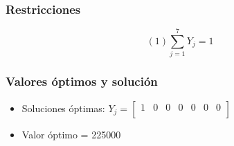 \documentclass[a4paper,12pt]{article}
\begin{document}
\subsubsection{Restricciones}
\begin{equation*}
	(1)\sum_{j=1}^{7}Y_j=1
\end{equation*}
\subsubsection{Valores óptimos y solución}
\begin{itemize}
	\item Soluciones óptimas:
	$Y_{j}=
	\begin{bmatrix}
	1 & 0 & 0 & 0 & 0 & 0 & 0\\
	\end{bmatrix}$
	\item Valor óptimo = 225000
\end{itemize}
\end{document}
